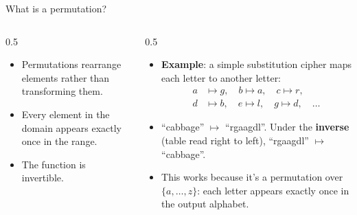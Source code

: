 \ifdefined\PRESENTATION\else\PassOptionsToClass{handout}{beamer}\fi\documentclass[aspectratio=169, lualatex]{beamer}
\begin{document}
\begin{frame}{What is a permutation?}
	\begin{columns}[c]
		\begin{column}{0.5\textwidth}
			\begin{itemize}[<+->]
				\item Permutations rearrange elements rather than transforming them.
				\item Every element in the domain appears exactly once in the range.
				\item The function is invertible.
			\end{itemize}
		\end{column}
		\begin{column}{0.5\textwidth}
			\begin{itemize}[<+->]
				\item \textbf{Example}: a simple substitution cipher maps each letter to another letter:
				      \begin{align*}
					      a & \mapsto g,\quad b \mapsto a,\quad c \mapsto r, \\
					      d & \mapsto b,\quad e \mapsto l,\quad g \mapsto d,\quad \ldots
				      \end{align*}
				\item ``cabbage'' $\mapsto$ ``rgaagdl''. Under the \textbf{inverse} (table read right to left), ``rgaagdl'' $\mapsto$ ``cabbage''.
				\item This works because it's a permutation over $\{a,\ldots,z\}$: each letter appears exactly once in the output alphabet.
			\end{itemize}
		\end{column}
	\end{columns}
\end{frame}
\end{document}
